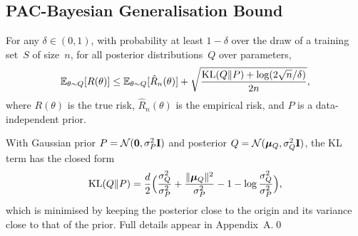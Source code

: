 \subsection{PAC-Bayesian Generalisation Bound}

\begin{theorem}
\label{thm:pac_bayes}
For any $\delta\in(0,1)$, with probability at least $1-\delta$ over the draw of a training set~$S$ of size~$n$, for all posterior distributions~$Q$ over parameters,
\begin{equation}
\mathbb{E}_{\theta\sim Q}[R(\theta)]
\le \mathbb{E}_{\theta\sim Q}[\hat{R}_n(\theta)]
+ \sqrt{\frac{\mathrm{KL}(Q\|P)+\log(2\sqrt{n}/\delta)}{2n}},
\label{eq:pac_bayes}
\end{equation}
where $R(\theta)$ is the true risk, $\hat{R}_n(\theta)$ is the empirical risk, and $P$ is a data-independent prior.
\end{theorem}

\noindent With Gaussian prior $P=\mathcal{N}(\mathbf{0},\sigma_P^2\mathbf{I})$ and posterior $Q=\mathcal{N}(\bm{\mu}_Q,\sigma_Q^2\mathbf{I})$, the KL term has the closed form
\begin{equation}
\mathrm{KL}(Q\|P)
= \frac{d}{2}\Bigl(
  \frac{\sigma_Q^2}{\sigma_P^2}
  + \frac{\|\bm{\mu}_Q\|^2}{\sigma_P^2}
  - 1
  - \log\frac{\sigma_Q^2}{\sigma_P^2}
\Bigr),
\label{eq:pac_kl_gauss}
\end{equation}which is minimised by keeping the posterior close to the origin and its variance close to that of the prior. Full details appear in Appendix~A.\qed

